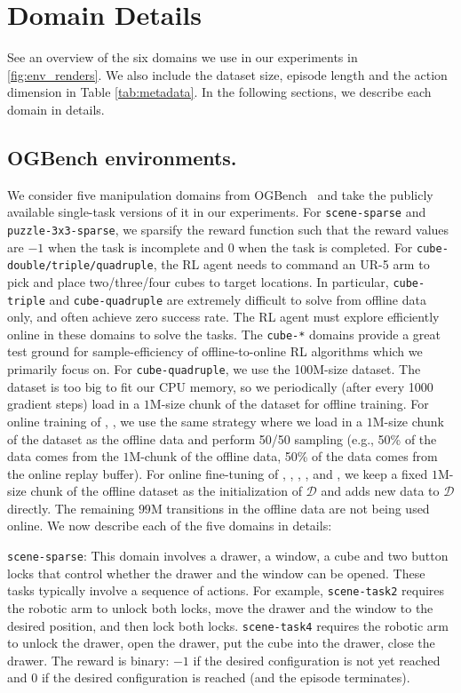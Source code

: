 \appendix
\section{Domain Details}
\label{appendix:domain}
See an overview of the six domains we use in our experiments in \cref{fig:env_renders}.
We also include the dataset size, episode length and the action dimension in Table \ref{tab:metadata}. In the following sections, we describe each domain in details.



\subsection{OGBench environments.} We consider five manipulation domains from OGBench~\citep{ogbench_park2024} and take the publicly available single-task versions of it in our experiments. For \texttt{scene-sparse} and \texttt{puzzle-3x3-sparse}, we sparsify the reward function such that the reward values are $-1$ when the task is incomplete and $0$ when the task is completed. For \texttt{cube-double/triple/quadruple}, the RL agent needs to command an UR-5 arm to pick and place two/three/four cubes to target locations. In particular, \texttt{cube-triple} and \texttt{cube-quadruple} are extremely difficult to solve from offline data only, and often achieve zero success rate. The RL agent must explore efficiently online in these domains to solve the tasks. The \texttt{cube-*} domains provide a great test ground for sample-efficiency of offline-to-online RL algorithms which we primarily focus on. For \texttt{cube-quadruple}, we use the 100M-size dataset. The dataset is too big to fit our CPU memory, so we periodically (after every 1000 gradient steps) load in a $1$M-size chunk of the dataset for offline training. For online training of , , we use the same strategy where we load in a $1$M-size chunk of the dataset as the offline data and perform 50/50 sampling (e.g., 50\% of the data comes from the $1$M-chunk of the offline data, 50\% of the data comes from the online replay buffer). For online fine-tuning of , , , , and , we keep a fixed $1$M-size chunk of the offline dataset as the initialization of $\mathcal{D}$ and adds new data to $\mathcal{D}$ directly. The remaining $99$M transitions in the offline data are not being used online. We now describe each of the five domains in details:

\texttt{scene-sparse}: This domain involves a drawer, a window, a cube and two button locks that control whether the drawer and the window can be opened. These tasks typically involve a sequence of actions. For example, \texttt{scene-task2} requires the robotic arm to unlock both locks, move the drawer and the window to the desired position, and then lock both locks. \texttt{scene-task4} requires the robotic arm to unlock the drawer, open the drawer, put the cube into the drawer, close the drawer. The reward is binary: $-1$ if the desired configuration is not yet reached and $0$ if the desired configuration is reached (and the episode terminates).

